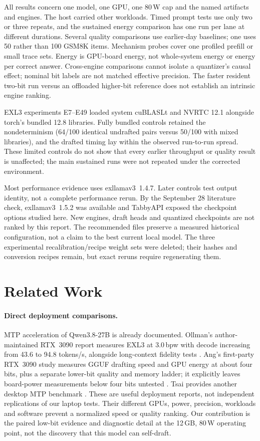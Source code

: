 \documentclass[11pt]{article}
\begin{document}
All results concern one model, one GPU, one 80\,W cap and the named artifacts
and engines. The host carried other workloads. Timed prompt tests use only
two or three repeats, and the sustained energy comparison has one run per
lane at different durations. Several quality comparisons use earlier-day
baselines; one uses 50 rather than 100 GSM8K items. Mechanism probes cover
one profiled prefill or small trace sets. Energy is GPU-board energy, not
whole-system energy or energy per correct answer. Cross-engine comparisons
cannot isolate a quantizer's causal effect; nominal bit labels are not
matched effective precision. The faster resident two-bit run versus an
offloaded higher-bit reference does not establish an intrinsic engine ranking.

EXL3 experiments E7--E49 loaded system cuBLASLt and NVRTC 12.1 alongside
torch's bundled 12.8 libraries. Fully bundled controls retained the
nondeterminism (64/100 identical undrafted pairs versus 50/100 with mixed
libraries), and the drafted timing lay within the observed run-to-run
spread. These limited controls do not show that every earlier throughput
or quality result is unaffected; the main sustained runs were not repeated
under the corrected environment.

Most performance evidence uses exllamav3~1.4.7. Later controls test output
identity, not a complete performance rerun. By the September 28 literature
check, exllamav3~1.5.2 was available and TabbyAPI exposed the checkpoint
options studied here. New engines, draft heads and quantized checkpoints
are not ranked by this report. The recommended files preserve a measured
historical configuration, not a claim to the best current local model.
The three experimental recalibration/recipe weight sets were deleted;
their hashes and conversion recipes remain, but exact reruns require
regenerating them.

\section{Related Work}
\label{sec:related}

\paragraph{Direct deployment comparisons.}
MTP acceleration of Qwen3.8-27B is already documented. Ollman's
author-maintained RTX~3090 report measures EXL3 at 3.0\,bpw with decode
increasing from 43.6 to 94.8 tokens/s, alongside long-context fidelity
tests \citep{ollman2026qwen38}. Ang's first-party RTX~3090 study measures
GGUF drafting speed and GPU energy at about four bits, plus a separate
lower-bit quality and memory ladder; it explicitly leaves board-power
measurements below four bits untested \citep{ang2026qwen38}.
Tsai provides another desktop MTP benchmark \citep{tsai2026rtx3090spec}.
These are useful deployment reports, not independent replications of our
laptop tests. Their different GPUs, power, precision, workloads and
software prevent a normalized speed or quality ranking. Our contribution
is the paired low-bit evidence and diagnostic detail at the 12\,GB,
80\,W operating point, not the discovery that this model can self-draft.
\end{document}
